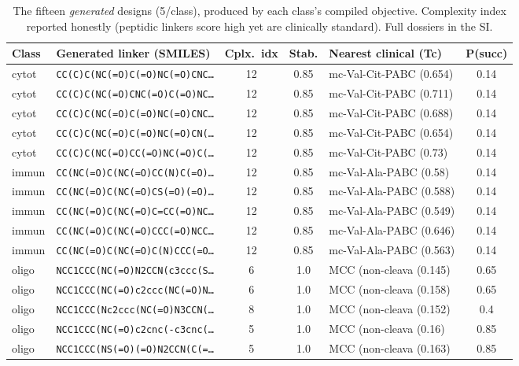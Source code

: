 \documentclass[10pt]{article}
\begin{document}
\begin{table}[t]\centering\caption{The fifteen \emph{generated} designs (5/class), produced by each class's compiled objective. Complexity index reported honestly (peptidic linkers score high yet are clinically standard). Full dossiers in the SI.}\label{tab:dossier}\scriptsize
\begin{tabular}{l l c c l c}\toprule
Class & Generated linker (SMILES) & Cplx.\ idx & Stab. & Nearest clinical (Tc) & P(succ) \\ \midrule
cytot & \texttt{CC(C)C(NC(=O)C(=O)NC(=O)CNC\ldots{}} & 12 & 0.85 & mc-Val-Cit-PABC (0.654) & 0.14 \\
cytot & \texttt{CC(C)C(NC(=O)CNC(=O)C(=O)NC\ldots{}} & 12 & 0.85 & mc-Val-Cit-PABC (0.711) & 0.14 \\
cytot & \texttt{CC(C)C(NC(=O)C(=O)NC(=O)CNC\ldots{}} & 12 & 0.85 & mc-Val-Cit-PABC (0.688) & 0.14 \\
cytot & \texttt{CC(C)C(NC(=O)C(=O)NC(=O)CN(\ldots{}} & 12 & 0.85 & mc-Val-Cit-PABC (0.654) & 0.14 \\
cytot & \texttt{CC(C)C(NC(=O)CC(=O)NC(=O)C(\ldots{}} & 12 & 0.85 & mc-Val-Cit-PABC (0.73) & 0.14 \\
immun & \texttt{CC(NC(=O)C(NC(=O)CC(N)C(=O)\ldots{}} & 12 & 0.85 & mc-Val-Ala-PABC (0.58) & 0.14 \\
immun & \texttt{CC(NC(=O)C(NC(=O)CS(=O)(=O)\ldots{}} & 12 & 0.85 & mc-Val-Ala-PABC (0.588) & 0.14 \\
immun & \texttt{CC(NC(=O)C(NC(=O)C=CC(=O)NC\ldots{}} & 12 & 0.85 & mc-Val-Ala-PABC (0.549) & 0.14 \\
immun & \texttt{CC(NC(=O)C(NC(=O)CCC(=O)NCC\ldots{}} & 12 & 0.85 & mc-Val-Ala-PABC (0.646) & 0.14 \\
immun & \texttt{CC(NC(=O)C(NC(=O)C(N)CCC(=O\ldots{}} & 12 & 0.85 & mc-Val-Ala-PABC (0.563) & 0.14 \\
oligo & \texttt{NCC1CCC(NC(=O)N2CCN(c3ccc(S\ldots{}} & 6 & 1.0 & MCC (non-cleava (0.145) & 0.65 \\
oligo & \texttt{NCC1CCC(NC(=O)c2ccc(NC(=O)N\ldots{}} & 6 & 1.0 & MCC (non-cleava (0.158) & 0.65 \\
oligo & \texttt{NCC1CCC(Nc2ccc(NC(=O)N3CCN(\ldots{}} & 8 & 1.0 & MCC (non-cleava (0.152) & 0.4 \\
oligo & \texttt{NCC1CCC(NC(=O)c2cnc(-c3cnc(\ldots{}} & 5 & 1.0 & MCC (non-cleava (0.16) & 0.85 \\
oligo & \texttt{NCC1CCC(NS(=O)(=O)N2CCN(C(=\ldots{}} & 5 & 1.0 & MCC (non-cleava (0.163) & 0.85 \\
\bottomrule\end{tabular}\end{table}
\end{document}
